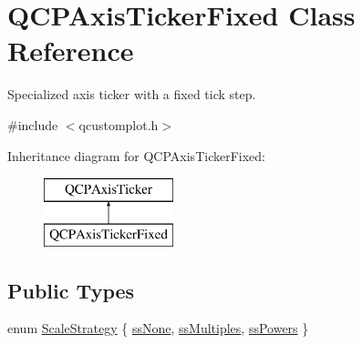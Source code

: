 \hypertarget{class_q_c_p_axis_ticker_fixed}{}\section{Q\+C\+P\+Axis\+Ticker\+Fixed Class Reference}
\label{class_q_c_p_axis_ticker_fixed}


Specialized axis ticker with a fixed tick step.  




{\ttfamily \#include $<$qcustomplot.\+h$>$}

Inheritance diagram for Q\+C\+P\+Axis\+Ticker\+Fixed\+:\begin{figure}[H]
\begin{center}
\leavevmode
\includegraphics[height=2.000000cm]{d5/dfb/class_q_c_p_axis_ticker_fixed}
\end{center}
\end{figure}
\subsection*{Public Types}
\begin{DoxyCompactItemize}
\item 
enum \mbox{\hyperlink{class_q_c_p_axis_ticker_fixed_a15b3d38b935d404b1311eb85cfb6a439}{Scale\+Strategy}} \{ \mbox{\hyperlink{class_q_c_p_axis_ticker_fixed_a15b3d38b935d404b1311eb85cfb6a439a6621275677a05caa0de204ae3956b85f}{ss\+None}}, 
\mbox{\hyperlink{class_q_c_p_axis_ticker_fixed_a15b3d38b935d404b1311eb85cfb6a439a22f651785f6412645837421896561104}{ss\+Multiples}}, 
\mbox{\hyperlink{class_q_c_p_axis_ticker_fixed_a15b3d38b935d404b1311eb85cfb6a439ac39d5813e9165ebd494307ae61ce5dce}{ss\+Powers}}
 \}
\end{DoxyCompactItemize}
